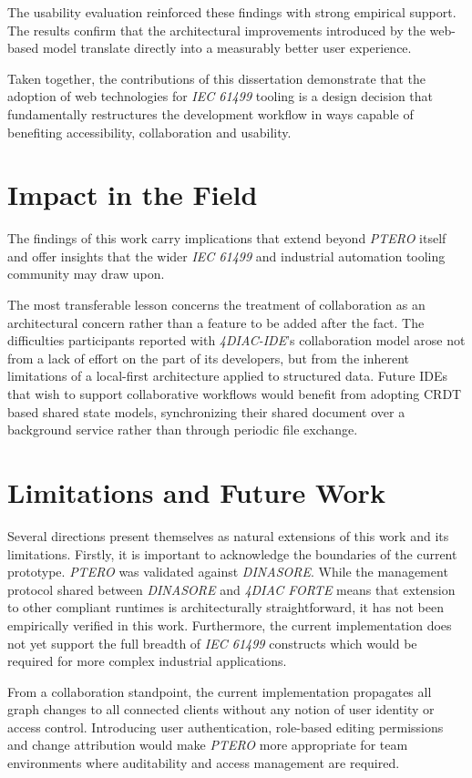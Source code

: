 The usability evaluation reinforced these findings with strong empirical support. The results confirm that the architectural improvements introduced by the web-based model translate directly into a measurably better user experience.

Taken together, the contributions of this dissertation demonstrate that the adoption of web technologies for \textit{IEC 61499} tooling is a design decision that fundamentally restructures the development workflow in ways capable of benefiting accessibility, collaboration and usability.

\section{Impact in the Field}
The findings of this work carry implications that extend beyond \textit{PTERO} itself and offer insights that the wider \textit{IEC 61499} and industrial automation tooling community may draw upon.

The most transferable lesson concerns the treatment of collaboration as an architectural concern rather than a feature to be added after the fact. The difficulties participants reported with \textit{4DIAC-IDE}'s collaboration model arose not from a lack of effort on the part of its developers, but from the inherent limitations of a local-first architecture applied to structured data. Future \acp{IDE} that wish to support collaborative workflows would benefit from adopting \ac{CRDT} based shared state models, synchronizing their shared document over a background service rather than through periodic file exchange.

\section{Limitations and Future Work}
Several directions present themselves as natural extensions of this work and its limitations. Firstly, it is important to acknowledge the boundaries of the current prototype. \textit{PTERO} was validated against \textit{DINASORE}. While the management protocol shared between \textit{DINASORE} and \textit{4DIAC FORTE} means that extension to other compliant runtimes is architecturally straightforward, it has not been empirically verified in this work. Furthermore, the current implementation does not yet support the full breadth of \textit{IEC 61499} constructs which would be required for more complex industrial applications.

From a collaboration standpoint, the current implementation propagates all graph changes to all connected clients without any notion of user identity or access control. Introducing user authentication, role-based editing permissions and change attribution would make \textit{PTERO} more appropriate for team environments where auditability and access management are required.


